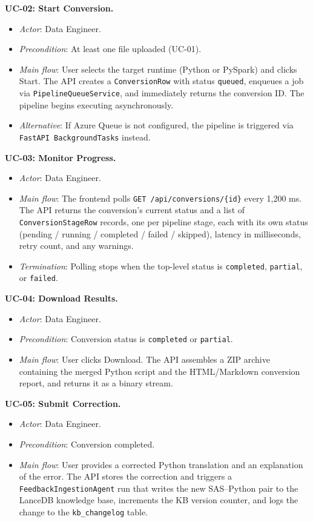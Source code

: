 \textbf{UC-02: Start Conversion.}
\begin{itemize}
  \item \textit{Actor}: Data Engineer.
  \item \textit{Precondition}: At least one file uploaded (UC-01).
  \item \textit{Main flow}: User selects the target runtime
    (Python or PySpark) and clicks Start. The API creates a
    \texttt{ConversionRow} with status \texttt{queued}, enqueues a job via
    \texttt{PipelineQueueService}, and immediately returns the conversion ID.
    The pipeline begins executing asynchronously.
  \item \textit{Alternative}: If Azure Queue is not configured, the pipeline
    is triggered via \texttt{FastAPI BackgroundTasks} instead.
\end{itemize}

\textbf{UC-03: Monitor Progress.}
\begin{itemize}
  \item \textit{Actor}: Data Engineer.
  \item \textit{Main flow}: The frontend polls \texttt{GET /api/conversions/\{id\}}
    every 1,200 ms. The API returns the conversion's current status and a list of
    \texttt{ConversionStageRow} records, one per pipeline stage, each with its
    own status (pending / running / completed / failed / skipped), latency in
    milliseconds, retry count, and any warnings.
  \item \textit{Termination}: Polling stops when the top-level status is
    \texttt{completed}, \texttt{partial}, or \texttt{failed}.
\end{itemize}

\textbf{UC-04: Download Results.}
\begin{itemize}
  \item \textit{Actor}: Data Engineer.
  \item \textit{Precondition}: Conversion status is \texttt{completed} or
    \texttt{partial}.
  \item \textit{Main flow}: User clicks Download. The API assembles a ZIP
    archive containing the merged Python script and the HTML/Markdown conversion
    report, and returns it as a binary stream.
\end{itemize}

\textbf{UC-05: Submit Correction.}
\begin{itemize}
  \item \textit{Actor}: Data Engineer.
  \item \textit{Precondition}: Conversion completed.
  \item \textit{Main flow}: User provides a corrected Python translation and
    an explanation of the error. The API stores the correction and triggers a
    \texttt{FeedbackIngestionAgent} run that writes the new SAS--Python pair
    to the LanceDB knowledge base, increments the KB version counter, and logs
    the change to the \texttt{kb\_changelog} table.
\end{itemize}


